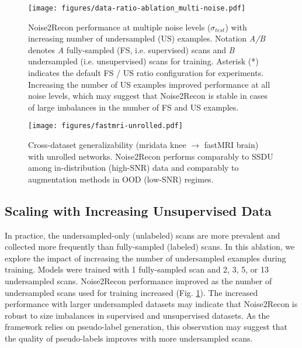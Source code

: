 \documentclass[10pt,twocolumn,letterpaper]{article}
\newcommand{\testnoise}{\sigma_{test}}
\begin{document}
\begin{figure}[t!]
  \centering
  \begin{center}
      \texttt{[image: figures/data-ratio-ablation\_multi-noise.pdf]}
  \end{center}
  \caption{Noise2Recon performance at multiple noise levels ($\testnoise$) with increasing number of undersampled (US) examples. Notation \textit{A/B} denotes \textit{A} fully-sampled (FS, i.e. supervised) scans and \textit{B} undersampled (i.e. unsupervised) scans for training. Asterisk (*) indicates the default FS / US ratio configuration for experiments. Increasing the number of US examples improved performance at all noise levels, which may suggest that Noise2Recon is stable in cases of large imbalances in the number of FS and US examples.}
  \label{fig:increasing-num-unsupervised}
\end{figure}

\begin{figure}[t!]
  \centering
  \begin{center}
      \texttt{[image: figures/fastmri-unrolled.pdf]}
  \end{center}
  \caption{Cross-dataset generalizability (mridata knee $\rightarrow$ fastMRI brain) with unrolled networks. Noise2Recon performs comparably to SSDU among in-distribution (high-SNR) data and comparably to augmentation methods in OOD (low-SNR) regimes.}
  \label{fig:fastmri-unrolled-noise}
\end{figure}


\subsection{Scaling with Increasing Unsupervised Data}
In practice, the undersampled-only (unlabeled) scans are more prevalent and collected more frequently than fully-sampled (labeled) scans. In this ablation, we explore the impact of increasing the number of undersampled examples during training. Models were trained with 1 fully-sampled scan and 2, 3, 5, or 13 undersampled scans. Noise2Recon performance improved as the number of undersampled scans used for training increased (Fig. \ref{fig:increasing-num-unsupervised}). The increased performance with larger undersampled datasets may indicate that Noise2Recon is robust to size imbalances in supervised and unsupervised datasets. As the framework relies on pseudo-label generation, this observation may suggest that the quality of pseudo-labels improves with more undersampled scans. 
\end{document}
